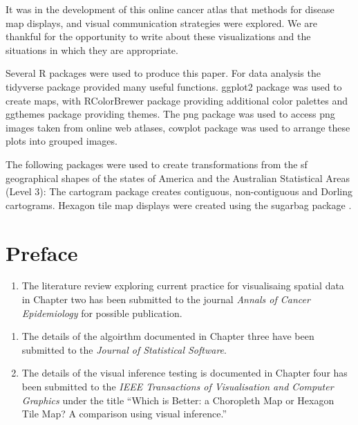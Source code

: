 \documentclass{monashthesis}
\begin{document}
It was in the development of this online cancer atlas that methods for disease map displays, and visual communication strategies were explored. We are thankful for the opportunity to write about these visualizations and the situations in which they are appropriate.

Several R \autocite{R} packages were used to produce this paper.
For data analysis the tidyverse package \autocite{tidyverse} provided many useful functions.
ggplot2 package \autocite{ggplot2} was used to create maps, with RColorBrewer package \autocite{RColorBrewer} providing additional color palettes and ggthemes \autocite{ggthemes} package providing themes.
The png package \autocite{png} was used to access png images taken from online web atlases, cowplot package \autocite{cowplot} was used to arrange these plots into grouped images.

The following packages were used to create transformations from the sf \autocite{sf} geographical shapes of the states of America \autocite{spData} and the Australian Statistical Areas (Level 3):
The cartogram \autocite{cartogram} package creates contiguous, non-contiguous and Dorling cartograms.
Hexagon tile map displays were created using the sugarbag package \autocite{sugarbag}.

\hypertarget{preface}{%
\chapter*{Preface}\label{preface}}

\begin{enumerate}
\def\labelenumi{\arabic{enumi}.}
\tightlist
\item
  The literature review exploring current practice for visualisaing spatial data in Chapter two has been submitted to the journal \emph{Annals of Cancer Epidemiology} for possible publication.
\end{enumerate}

\begin{enumerate}
\def\labelenumi{\arabic{enumi}.}
\setcounter{enumi}{1}
\item
  The details of the algoirthm documented in Chapter three have been submitted to the \emph{Journal of Statistical Software}.
\item
  The details of the visual inference testing is documented in Chapter four has been submitted to the \emph{IEEE Transactions of Visualisation and Computer Graphics} under the title ``Which is Better: a Choropleth Map or Hexagon Tile Map? A comparison using visual inference.''
\end{enumerate}
\end{document}
